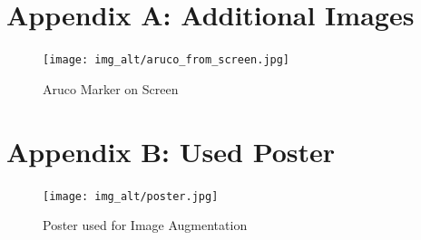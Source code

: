 \documentclass[a4paper,twocolumn]{article}
\begin{document}
\appendix
\section*{Appendix A: Additional Images}

\begin{figure}[h!]
    \centering
    \texttt{[image: img\_alt/aruco\_from\_screen.jpg]}
    \caption{Aruco Marker on Screen \cite{tim-schweitzer}}
    \label{fig:example-appendix}
\end{figure}

\section*{Appendix B: Used Poster}

\begin{figure}[h!]
    \centering
    \texttt{[image: img\_alt/poster.jpg]}
    \caption{Poster used for Image Augmentation\cite{v_speed}}
    \label{fig:img-poster}
\end{figure}
\end{document}
